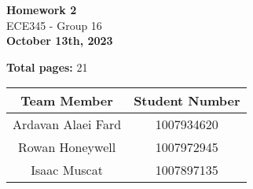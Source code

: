 \begin{titlepage}
    \begin{center}
    {\fontsize{40}{48}\selectfont \bfseries Homework 2} 
    \\\vspace{20pt}
    {\LARGE ECE345 - Group 16} \\
    \vspace{20pt}
    \textbf{October 13th, 2023}
    \vspace{8pt}

    \textbf{Total pages:} 21
    \end{center}

    \begin{table}[!ht]
        \centering
        \begin{tabular}{|c|c|}
        \hline
            \textbf{Team Member} & \textbf{Student Number} \\ \hline
            Ardavan Alaei Fard & 1007934620 \\ \hline
            Rowan Honeywell & 1007972945 \\ \hline
            Isaac Muscat & 1007897135 \\ \hline
        \end{tabular}
    \end{table}
\end{titlepage}